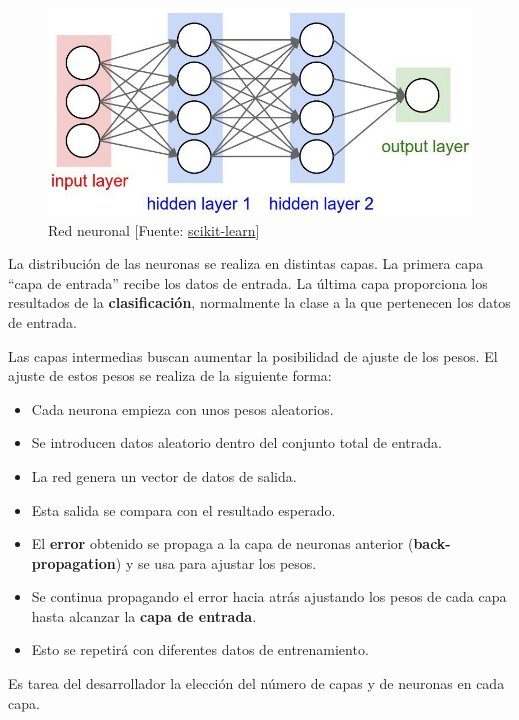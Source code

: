 	\begin{figure}[htb]
		\begin{center}
			\includegraphics[width=4.5in]{figures/neural_network.jpg}
			\caption{Red neuronal [Fuente: \href{www.scikit-learn.org}{scikit-learn}]}
		\end{center}
		\label{network}
	\end{figure}

	La distribución de las neuronas se realiza en distintas capas. La primera capa ``capa de entrada'' recibe los datos de entrada. La última capa proporciona los resultados de la \textbf{clasificación}, normalmente la clase a la que pertenecen los datos de entrada.

	Las capas intermedias buscan aumentar la posibilidad de ajuste de los pesos. El ajuste de estos pesos se realiza de la siguiente forma:

	\begin{itemize}
		\item Cada neurona empieza con unos pesos aleatorios.
		\item Se introducen datos aleatorio dentro del conjunto total de entrada.
		\item La red genera un vector de datos de salida.
		\item Esta salida se compara con el resultado esperado.
		\item El \textbf{error} obtenido se propaga a la capa de neuronas anterior (\textbf{back-propagation}) y se usa para ajustar los pesos.
		\item Se continua propagando el error hacia atrás ajustando los pesos de cada capa hasta alcanzar la \textbf{capa de entrada}.
		\item Esto se repetirá con diferentes datos de entrenamiento.
 	\end{itemize}

	Es tarea del desarrollador la elección del número de capas y de neuronas en cada capa.

